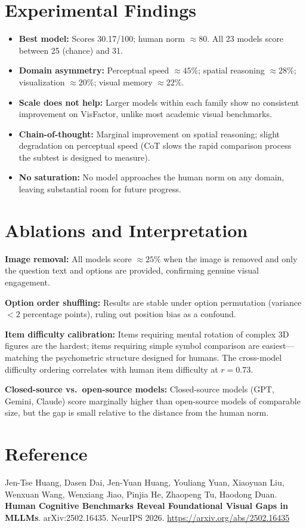 \documentclass[10pt,twocolumn]{article}
\begin{document}
\section{Experimental Findings}

\begin{itemize}[itemsep=2pt,parsep=0pt]
  \item \textbf{Best model:} Scores 30.17/100; human norm $\approx 80$.
    All 23 models score between 25 (chance) and 31.
  \item \textbf{Domain asymmetry:} Perceptual speed $\approx 45\%$;
    spatial reasoning $\approx 28\%$; visualization $\approx 20\%$;
    visual memory $\approx 22\%$.
  \item \textbf{Scale does not help:} Larger models within each family
    show no consistent improvement on VisFactor, unlike most academic
    visual benchmarks.
  \item \textbf{Chain-of-thought:} Marginal improvement on spatial
    reasoning; slight degradation on perceptual speed (CoT slows the
    rapid comparison process the subtest is designed to measure).
  \item \textbf{No saturation:} No model approaches the human norm on
    any domain, leaving substantial room for future progress.
\end{itemize}

\section{Ablations and Interpretation}

\textbf{Image removal:}
All models score $\approx 25\%$ when the image is removed and only the
question text and options are provided, confirming genuine visual engagement.

\textbf{Option order shuffling:}
Results are stable under option permutation (variance $< 2$ percentage points),
ruling out position bias as a confound.

\textbf{Item difficulty calibration:}
Items requiring mental rotation of complex 3D figures are the hardest;
items requiring simple symbol comparison are easiest---matching the
psychometric structure designed for humans. The cross-model difficulty
ordering correlates with human item difficulty at $r = 0.73$.

\textbf{Closed-source vs.\ open-source models:}
Closed-source models (GPT, Gemini, Claude) score marginally higher than
open-source models of comparable size, but the gap is small relative
to the distance from the human norm.

\section*{Reference}

Jen-Tse Huang, Dasen Dai, Jen-Yuan Huang, Youliang Yuan, Xiaoyuan Liu,
Wenxuan Wang, Wenxiang Jiao, Pinjia He, Zhaopeng Tu, Haodong Duan.
\textbf{Human Cognitive Benchmarks Reveal Foundational Visual Gaps in MLLMs}.
arXiv:2502.16435. NeurIPS 2026.
\url{https://arxiv.org/abs/2502.16435}
\end{document}

